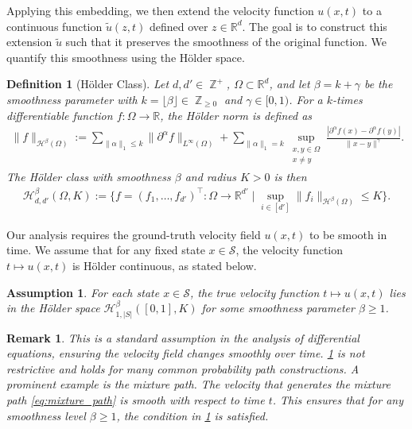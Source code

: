 \documentclass[12pt]{article}
\numberwithin{equation}{section}
\let\tilde\widetilde
\newcommand{\wt}{\widetilde}
\renewcommand{\tilde}{\wt}
\DeclareMathOperator*{\Z}{\mathbb{Z}}
\def\R{\mathbb{R}}
\theoremstyle{theoremstyle}
\newtheorem{definition}{Definition}[section]
\newtheorem{assumption}{Assumption}[section]
\newtheorem{remark}{Remark}[section]
\numberwithin{equation}{section}
\numberwithin{theorem}{section}
\numberwithin{proposition}{section}
\numberwithin{definition}{section}
\numberwithin{lemma}{section}
\numberwithin{assumption}{section}
\numberwithin{remark}{section}
\begin{document}
Applying this embedding, we then extend the velocity function $u(x,t)$ to a continuous function $\tilde{u}(z,t)$ defined over $z \in \mathbb{R}^d$. The goal is to construct this extension $\tilde{u}$ such that it preserves the smoothness of the original function. We quantify this smoothness using the H\"older space.

\begin{definition}[H\"older Class]\label{def:holder_space}
Let $d,d'\in\Z^+$, $\Omega\subset\R^d$, and let $\beta=k+\gamma$ be the smoothness parameter with $k=\lfloor\beta\rfloor\in\Z_{\ge 0}$ and $\gamma\in[0,1)$.  
For a $k$-times differentiable function $f:\Omega\to\R$, the H\"older norm is defined as
\begin{align*}
    \|f\|_{\mathcal{H}^\beta(\Omega)}
    := \sum_{\|\alpha\|_1 \leq k} \|\partial^\alpha f\|_{L^\infty(\Omega)}
       + \sum_{\|\alpha\|_1 = k}\sup_{\substack{x,y\in\Omega\\x\neq y}}
          \frac{|\partial^\alpha f(x)-\partial^\alpha f(y)|}{\|x-y\|^\gamma}.
\end{align*}
The H\"older class with smoothness $\beta$ and radius $K>0$ is then
\begin{align*}
    \mathcal{H}^\beta_{d,d'}(\Omega,K)
    := \{f=(f_1,\dots,f_{d'})^\top:\Omega\to\R^{d'} \mid 
    \sup_{i\in[d']} \|f_i\|_{\mathcal{H}^\beta(\Omega)} \leq K \}.
\end{align*}
\end{definition}






Our analysis requires the ground-truth velocity field $u(x,t)$ to be smooth in time. 
We assume that for any fixed state $x \in \mathcal{S}$, the velocity function $t \mapsto u(x,t)$ is Hölder continuous, as stated below.

\begin{assumption}
\label{ass:holder_smoothness}
For each state $x \in \mathcal{S}$, the true velocity function $t \mapsto u(x,t)$ lies in the Hölder space $\mathcal{H}^\beta_{1,|S|}([0,1],K)$ for some smoothness parameter $\beta \geq 1$.
\end{assumption}

\begin{remark}
This is a standard assumption in the analysis of differential equations, ensuring the velocity field changes smoothly over time.
\cref{ass:holder_smoothness} is not restrictive and holds for many common probability path constructions. 
A prominent example is the mixture path.
The velocity that generates the mixture path \eqref{eq:mixture_path} is smooth with respect to time $t$. 
This ensures that for any smoothness level $\beta \geq 1$, the condition in  \cref{ass:holder_smoothness} is satisfied.
\end{remark}
\end{document}
